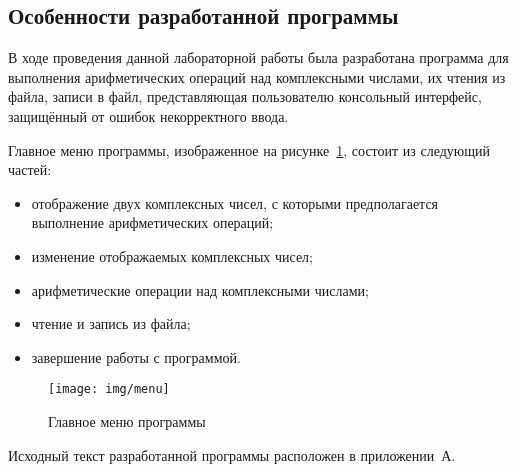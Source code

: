 \subsection{Особенности разработанной программы}

В ходе проведения данной лабораторной работы была разработана программа для выполнения арифметических операций над комплексными числами, их чтения из файла, записи в файл, представляющая пользователю консольный интерфейс, защищённый от ошибок некорректного ввода.

Главное меню программы, изображенное на рисунке~\ref{fig:menu}, состоит из следующий частей:
\begin{itemize}
  \item отображение двух комплексных чисел, с которыми предполагается выполнение арифметических операций;
  \item изменение отображаемых комплексных чисел;
  \item арифметические операции над комплексными числами;
  \item чтение и запись из файла;
  \item завершение работы с программой.
\end{itemize}

\begin{figure}[htbp]
  \centering
  \texttt{[image: img/menu]}
  \caption{Главное меню программы}\label{fig:menu}
\end{figure}

\pagebreak

Исходный текст разработанной программы расположен в приложении~А.

\newpage